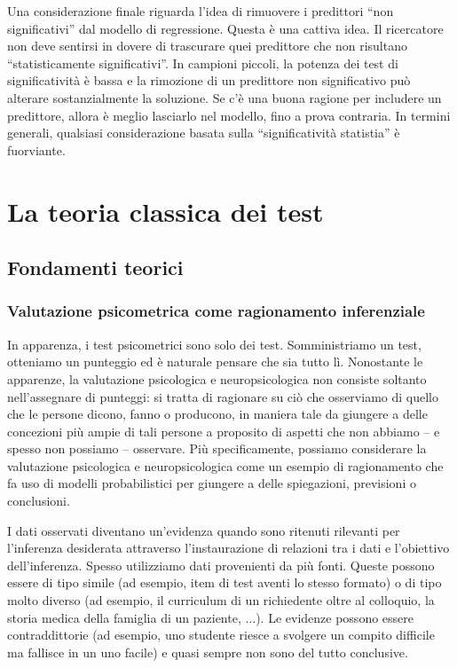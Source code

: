 \documentclass[
  11pt,
]{krantz}
\theoremstyle{definition}
\theoremstyle{definition}
\theoremstyle{definition}
\theoremstyle{definition}
\theoremstyle{remark}
\begin{document}
Una considerazione finale riguarda l'idea di rimuovere i predittori ``non significativi'' dal modello di regressione. Questa è una cattiva idea. Il ricercatore non deve sentirsi in dovere di trascurare quei predittore che non risultano ``statisticamente significativi''. In campioni piccoli, la potenza dei test di significatività è bassa e la rimozione di un predittore non significativo può alterare sostanzialmente la soluzione. Se c'è una buona ragione per includere un predittore, allora è meglio lasciarlo nel modello, fino a prova contraria. In termini generali, qualsiasi considerazione basata sulla ``significatività statistia'' è fuorviante.

\hypertarget{part-la-teoria-classica-dei-test}{%
\part{La teoria classica dei test}\label{part-la-teoria-classica-dei-test}}

\hypertarget{ch:teoria_classica}{%
\chapter{Fondamenti teorici}\label{ch:teoria_classica}}

\hypertarget{valutazione-psicometrica-come-ragionamento-inferenziale}{%
\section{Valutazione psicometrica come ragionamento inferenziale}\label{valutazione-psicometrica-come-ragionamento-inferenziale}}

In apparenza, i test psicometrici sono solo dei test. Somministriamo un test, otteniamo un punteggio ed è naturale pensare che sia tutto lì. Nonostante le apparenze, la valutazione psicologica e neuropsicologica non consiste soltanto nell'assegnare di punteggi: si tratta di ragionare su ciò che osserviamo di quello che le persone dicono, fanno o producono, in maniera tale da giungere a delle concezioni più ampie di tali persone a proposito di aspetti che non abbiamo -- e spesso non possiamo -- osservare. Più specificamente, possiamo considerare la valutazione psicologica e neuropsicologica come un esempio di ragionamento che fa uso di modelli probabilistici per giungere a delle spiegazioni, previsioni o conclusioni.

I dati osservati diventano un'evidenza quando sono ritenuti rilevanti per l'inferenza desiderata attraverso l'instaurazione di relazioni tra i dati e l'obiettivo dell'inferenza. Spesso utilizziamo dati provenienti da più fonti. Queste possono essere di tipo simile (ad esempio, item di test aventi lo stesso formato) o di tipo molto diverso (ad esempio, il curriculum di un richiedente oltre al colloquio, la storia medica della famiglia di un paziente, \(\dots\)). Le evidenze possono essere contraddittorie (ad esempio, uno studente riesce a svolgere un compito difficile ma fallisce in un uno facile) e quasi sempre non sono del tutto conclusive.
\end{document}
